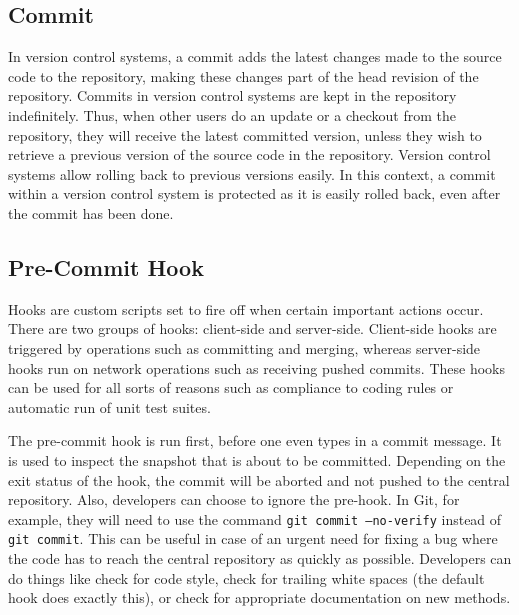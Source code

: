 \documentclass[conference]{IEEEtran}
\begin{document}
\subsection{Commit}
\label{sub:Commit}

In version control systems, a commit adds the latest changes made to the source code to the repository, making these changes part of the head revision of the repository.
Commits in version control systems are kept in the repository indefinitely. Thus, when other users do an update or a checkout from the repository, they will receive the latest committed version, unless they wish to retrieve a previous version of the source code in the repository.
Version control systems allow rolling back to previous versions easily.
In this context, a commit within a version control system is protected as it is easily rolled back, even after the commit has been done.

\subsection{Pre-Commit Hook}
\label{sub:Pre-Commit Hook}

Hooks are custom scripts set to fire off when certain important actions occur.
There are two groups of  hooks: client-side and server-side.
Client-side hooks are triggered by operations such as committing and merging, whereas server-side hooks run on network operations such as receiving pushed commits.
These hooks can be used for all sorts of reasons such as compliance to coding rules or automatic run of unit test suites.


The pre-commit hook is run first, before one even types in a commit message. It is used to inspect the snapshot that is about to be committed.
Depending on the exit status of the hook, the commit will be aborted and not pushed to the central repository.
Also, developers can choose to ignore the pre-hook. In Git, for example, they will need to use the command \texttt{git commit --no-verify} instead of \texttt{git commit}.
This can be useful in case of an urgent need for fixing a bug where the code has to reach the central repository as quickly as possible.
Developers can do things like check for code style, check for trailing white spaces (the default hook does exactly this), or check for appropriate documentation on new methods.
\end{document}
